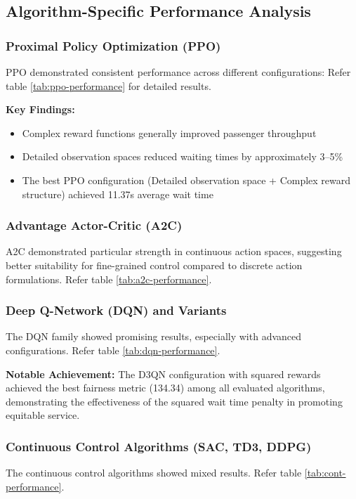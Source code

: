\documentclass[10pt,twocolumn]{article}
\begin{document}
\subsection{Algorithm-Specific Performance Analysis}

\subsubsection{Proximal Policy Optimization (PPO)}
PPO demonstrated consistent performance across different configurations:
Refer table \ref{tab:ppo-performance} for detailed results.

\textbf{Key Findings:}
\begin{itemize}
    \item Complex reward functions generally improved passenger throughput
    \item Detailed observation spaces reduced waiting times by approximately 3--5\%
    \item The best PPO configuration (Detailed observation space + Complex reward structure) achieved 11.37s average wait time
\end{itemize}

\subsubsection{Advantage Actor-Critic (A2C)}
A2C demonstrated particular strength in continuous action spaces, suggesting better suitability for fine-grained control compared to discrete action formulations. Refer table \ref{tab:a2c-performance}.

\subsubsection{Deep Q-Network (DQN) and Variants}
The DQN family showed promising results, especially with advanced configurations. Refer table \ref{tab:dqn-performance}.

\textbf{Notable Achievement:} The D3QN configuration with squared rewards achieved the best fairness metric (134.34) among all evaluated algorithms, demonstrating the effectiveness of the squared wait time penalty in promoting equitable service.

\subsubsection{Continuous Control Algorithms (SAC, TD3, DDPG)}
The continuous control algorithms showed mixed results. Refer table \ref{tab:cont-performance}.
\end{document}
